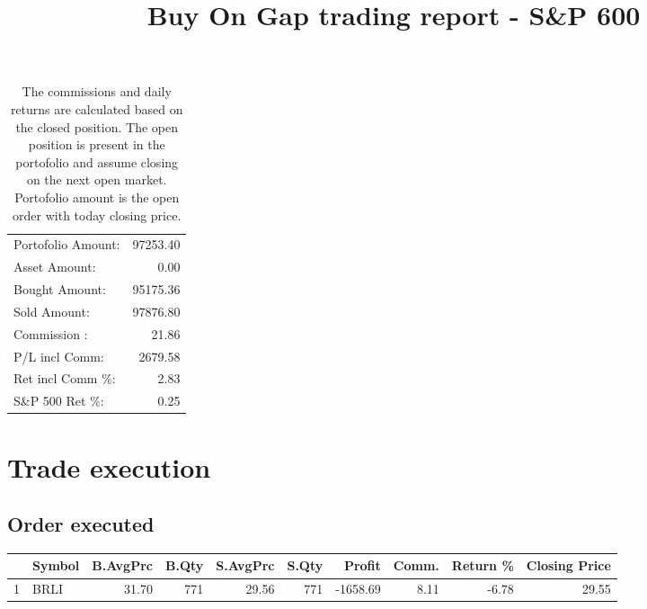\documentclass{tufte-handout}\usepackage[]{graphicx}\usepackage[]{color}
\begin{document}
\begin{table}[ht]
\begin{tabular}{lr}
   \hline
Portofolio Amount: & 97253.40 \\ 
  Asset Amount: & 0.00 \\ 
  Bought Amount: & 95175.36 \\ 
  Sold   Amount: & 97876.80 \\ 
  Commission   : & 21.86 \\ 
  P/L incl Comm: & 2679.58 \\ 
  Ret incl Comm \%: & 2.83 \\ 
  S\&P 500 Ret \%: & 0.25 \\ 
   \hline
\end{tabular}
\caption{The commissions and daily returns are calculated based on the closed position.
The open position is present in the portofolio and assume closing on the next open market.
Portofolio amount is the open order with today closing price.} 
\end{table}



% 
% 


\title{Buy On Gap trading report - S\&P 600}
\maketitle

\section{Trade execution}
\subsection{Order executed}


\begin{table}[ht]
\centering
\begin{tabular}{llrrrrrrr|r}
  \hline
 & Symbol & B.AvgPrc & B.Qty & S.AvgPrc & S.Qty & Profit & Comm. & Return \% & Closing Price \\ 
  \hline
1 & BRLI & 31.70 & 771 & 29.56 & 771 & -1658.69 & 8.11 & -6.78 & 29.55 \\ 
   \hline
\end{tabular}
\end{table}
\end{document}

